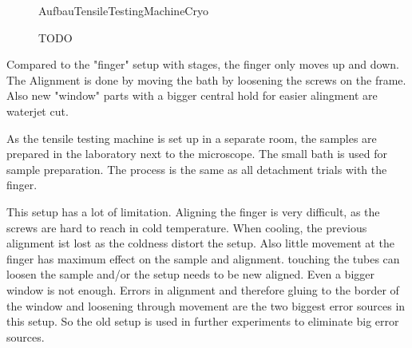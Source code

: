 \begin{figure}[hbt!]
	\centering
	\begin{overpic}[width=10cm]{AufbauTensileTestingMachineCryo}
		\begin{comment}
			\white
			\put(40,25){\vector(1,1){10}}
			\put(40,25){\makebox(0,0)[r]{shuttle haven}}
			\put(20,45){\vector(1,0){15}}
			\put(20,45){\makebox(0,0)[r]{tool bath}}
			\put(73,35){\vector(-1,1){10}}
			\put(73,35){\makebox(0,0)[l]{ethanol bath}}
			\put(73,27){\vector(-1,1){10}}
			\put(73,27){\makebox(0,0)[l]{HFE bath}}
			\put(48,65){\vector(-0.25,-1){2.8}}
			\put(52,65){\vector(0.25,-1){2.8}}
			\put(50,65){\makebox(0,0)[b]{container holder}}
			\put(75,72){\vector(-1,0){10}}
			\put(79,68){\vector(-1,-1){3.5}}
			\put(75,72){\makebox(0,0)[lt]{gas outlets}}
			\put(75,72){\makebox(0,0)[lb]{nitrogen}}
			\put(30,62){\vector(1,-1){10}}
			\put(30,62){\makebox(0,0)[rb]{work surface}}
		\end{comment}
	
	\end{overpic}
	\caption{TODO}
	\label{fig:tensileTestingMachineCryo}
\end{figure}

Compared to the "finger" setup with stages, the finger only moves up and down. The Alignment is done by moving the bath by loosening the screws on the frame. Also new "window" parts with a bigger central hold for easier alingment are waterjet cut.

As the tensile testing machine is set up in a separate room, the samples are prepared in the laboratory next to the microscope. The small bath is used for sample preparation. The process is the same as all detachment trials with the finger. 

This setup has a lot of limitation. Aligning the finger is very difficult, as the screws are hard to reach in cold temperature. When cooling, the previous alignment ist lost as the coldness distort the setup. Also little movement at the finger has maximum effect on the sample and alignment. touching the tubes can loosen the sample and/or the setup needs to be new aligned. Even a bigger window is not enough. Errors in alignment and therefore gluing to the border of the window and loosening through movement are the two biggest error sources in this setup. So the old setup is used in further experiments to eliminate big error sources.

